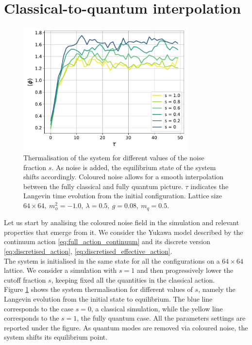 \section{Classical-to-quantum interpolation}
\label{sec:classical_to_quantum}
\begin{figure}[h]
    \centering
    \includegraphics[width=0.8\textwidth]{figures/slide_broken/thermalisation.pdf}
    \caption[Thermalisation of the system for different values of the noise fraction $s$.]{Thermalisation of the system for different values of the noise fraction $s$. As noise is added, the equilibrium state of the system shifts accordingly. Coloured noise allows for a smooth interpolation between the fully classical and fully quantum picture. $\tau$ indicates the Langevin time evolution from the initial configuration. Lattice size $64 \times 64, \ m_\phi^2=-1.0, \ \lambda=0.5, \ g=0.08, \ m_q = 0.5$.}
    \label{fig:thermalisation_different_noise_fracs}
\end{figure}
\noindent Let us start by analising the coloured noise field in the simulation and relevant properties that emerge from it. We consider the Yukawa model described by the continuum action \eqref{eq:full_action_continuum} and its discrete version \eqref{eq:discretised_action}, \eqref{eq:discretised_effective_action}.\\
The system is initialised in the same state for all the configurations on a $64 \times 64$ lattice. We consider a simulation with $s=1$ and then progressively lower the cutoff fraction $s$, keeping fixed all the quantities in the classical action. \\
Figure \ref{fig:thermalisation_different_noise_fracs} shows the system thermalisation for different values of $s$, namely the Langevin evolution from the initial state to equilibrium. The blue line corresponds to the case $s=0$, a classical simulation, while the yellow line corresponds to the $s=1$, the fully quantum case.  All the parameters settings are reported under the figure. As quantum modes are removed via coloured noise, the system shifts its equilibrium point. \\~\\ 
